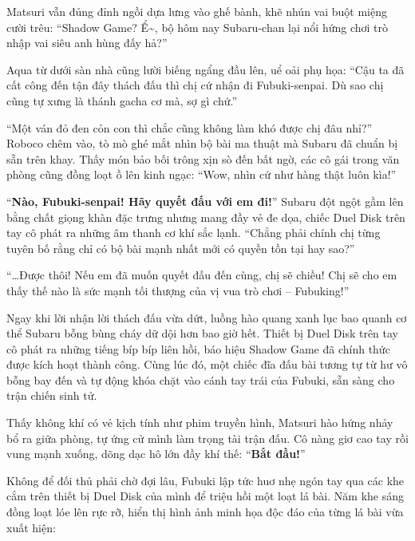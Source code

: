 \documentclass[../main.tex]{subfiles}
\begin{document}
Matsuri vẫn đủng đỉnh ngồi dựa lưng vào ghế bành, khẽ nhún vai buột miệng cười trêu: ``Shadow Game? Ể\~{}, bộ hôm nay Subaru-chan lại nổi hứng chơi trò nhập vai siêu anh hùng đấy hả?''

Aqua từ dưới sàn nhà cũng lười biếng ngẩng đầu lên, uể oải phụ họa: ``Cậu ta đã cất công đến tận đây thách đấu thì chị cứ nhận đi Fubuki-senpai. Dù sao chị cũng tự xưng là thánh gacha cơ mà, sợ gì chứ.''

``Một ván đỏ đen cỏn con thì chắc cũng không làm khó được chị đâu nhỉ?'' Roboco chêm vào, tò mò ghé mắt nhìn bộ bài ma thuật mà Subaru đã chuẩn bị sẵn trên khay. Thấy món bảo bối trông xịn sò đến bất ngờ, các cô gái trong văn phòng cũng đồng loạt ồ lên kinh ngạc: ``Wow, nhìn cứ như hàng thật luôn kìa!''

``\textbf{Nào, Fubuki-senpai! Hãy quyết đấu với em đi!}'' Subaru đột ngột gầm lên bằng chất giọng khàn đặc trưng nhưng mang đầy vẻ đe dọa, chiếc Duel Disk trên tay cô phát ra những âm thanh cơ khí sắc lạnh. ``Chẳng phải chính chị từng tuyên bố rằng chỉ có bộ bài mạnh nhất mới có quyền tồn tại hay sao?''

``\dots Được thôi! Nếu em đã muốn quyết đấu đến cùng, chị sẽ chiều! Chị sẽ cho em thấy thế nào là sức mạnh tối thượng của vị vua trò chơi -- Fubuking!''

Ngay khi lời nhận lời thách đấu vừa dứt, luồng hào quang xanh lục bao quanh cơ thể Subaru bỗng bùng cháy dữ dội hơn bao giờ hết. Thiết bị Duel Disk trên tay cô phát ra những tiếng bíp bíp liên hồi, báo hiệu Shadow Game đã chính thức được kích hoạt thành công. Cùng lúc đó, một chiếc đĩa đấu bài tương tự từ hư vô bỗng bay đến và tự động khóa chặt vào cánh tay trái của Fubuki, sẵn sàng cho trận chiến sinh tử.

Thấy không khí có vẻ kịch tính như phim truyền hình, Matsuri hào hứng nhảy bổ ra giữa phòng, tự ứng cử mình làm trọng tài trận đấu. Cô nàng giơ cao tay rồi vung mạnh xuống, dõng dạc hô lớn đầy khí thế: ``\textbf{Bắt đầu!}''

\ct

Không để đối thủ phải chờ đợi lâu, Fubuki lập tức huơ nhẹ ngón tay qua các khe cắm trên thiết bị Duel Disk của mình để triệu hồi một loạt lá bài. Năm khe sáng đồng loạt lóe lên rực rỡ, hiển thị hình ảnh minh họa độc đáo của từng lá bài vừa xuất hiện:
\end{document}
